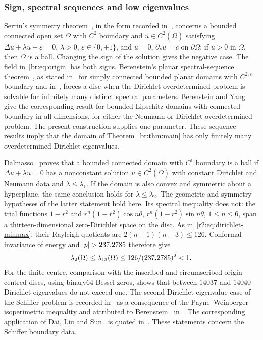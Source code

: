 \subsubsection{Sign, spectral sequences and low eigenvalues}
Serrin's symmetry theorem~\cite{Ser71}, in the form recorded
in~\cite[Theorem~2]{Dal14}, concerns a bounded connected open set
$\Omega$ with $C^2$ boundary and $u\in C^2(\overline\Omega)$ satisfying
$\Delta u+\lambda u+\varepsilon=0$, $\lambda>0$,
$\varepsilon\in\{0,\pm1\}$, and $u=0$, $\partial_\nu u=c$ on
$\partial\Omega$: if $u>0$ in $\Omega$, then $\Omega$ is a ball. Changing the sign of the solution gives the negative case.
The field in~\eqref{br:eq:origin} has both signs.
Berenstein's planar spectral-sequence theorem~\cite{Ber80}, as stated
in~\cite[Proposition~1.1]{Dal10} for simply connected bounded planar
domains with $C^{2,\varepsilon}$ boundary and in~\cite[\S0]{BY87}, forces a disc
when the Dirichlet overdetermined problem is solvable for infinitely
many distinct spectral parameters. Berenstein and Yang~\cite[Theorem 1]{BY87}
give the corresponding result for bounded Lipschitz domains with
connected boundary in all dimensions, for either the Neumann or
Dirichlet overdetermined problem. The present construction supplies
one parameter. These sequence results imply that the domain of
Theorem~\ref{br:thm:main} has only finitely many overdetermined Dirichlet
eigenvalues.

Dalmasso~\cite[Theorem~1]{Dal14} proves that a bounded connected domain
with $C^1$ boundary is a ball if $\Delta u+\lambda u=0$ has a
nonconstant solution $u\in C^2(\overline\Omega)$ with constant
Dirichlet and Neumann data and $\lambda\le\lambda_1$. If the domain
is also convex and symmetric about a hyperplane, the same conclusion
holds for $\lambda\le\lambda_2$.
The geometric and symmetry hypotheses of the latter statement hold
here. Its spectral inequality does not: the trial functions
$1-r^2$ and $r^n(1-r^2)\cos n\theta$, $r^n(1-r^2)\sin n\theta$,
$1\le n\le6$, span a thirteen-dimensional zero-Dirichlet space on
the disc. As in~\eqref{r2:eq:dirichlet-minmax}, their Rayleigh quotients
are $2(n+1)(n+3)\le126$. Conformal invariance of energy and
$|p|>\brDerivativeLo$ therefore give
\begin{equation}\label{br:eq:low-index}
 \lambda_2(\Omega)\le\lambda_{13}(\Omega)
 \le126/(237.2785)^2<1.
\end{equation}
For the finite centre, comparison with the inscribed and circumscribed
origin-centred discs, using binary64 Bessel zeros, shows that between
$14037$ and $14040$ Dirichlet eigenvalues do not exceed one.
The second-Dirichlet-eigenvalue case of the Schiffer problem is recorded
in~\cite[\S0]{BY87} as a consequence of the Payne--Weinberger
isoperimetric inequality and attributed to Berenstein~\cite{Ber80}
in~\cite[Remark~1]{Dal14}. The corresponding application of Dai, Liu
and Sun~\cite{DLS26} is quoted in~\cite[\S1]{DSWZ25}. These statements
concern the Schiffer boundary data.

